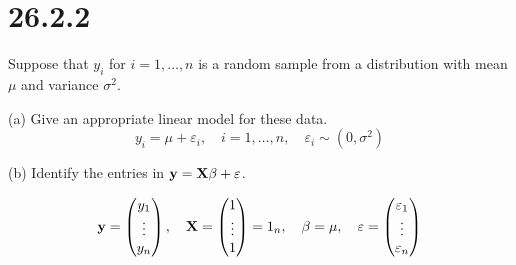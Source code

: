 \section*{26.2.2}
Suppose that $y_i$ for $i=1,\ldots,n$ is a random sample from a
distribution with mean $\mu$ and variance $\sigma^2$.

\bigskip
\noindent
(a) Give an appropriate linear model for these data.
$$y_i=\mu+\varepsilon_i,\quad i=1,\ldots,n,\quad\varepsilon_i\sim(0,\sigma^2)$$

\bigskip
\noindent
(b) Identify the entries in ${\bf y}={\bf X}\beta+\varepsilon$.

$${\bf y}=\left(\begin{matrix}y_1\cr\vdots\cr y_n\end{matrix}\right),\quad
{\bf X}=\left(\begin{matrix}1\cr\vdots\cr1\end{matrix}\right)=1_n,\quad
\beta=\mu,\quad
\varepsilon=\left(\begin{matrix}\varepsilon_1\cr\vdots\cr\varepsilon_n
\end{matrix}\right)
$$
